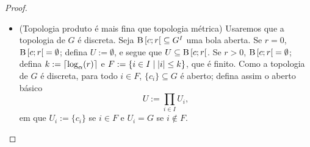 \begin{proof}
\begin{itemize}
	\item (Topologia produto é mais fina que topologia métrica) Usaremos que a topologia de $G$ é discreta. Seja $\mathrm{B}\left[{c};{r}\right[ \subseteq G^{I}$ uma bola aberta. Se $r=0$, $\mathrm{B}\left[{c};{r}\right[ = \emptyset$; defina $U := \emptyset$, e segue que $U \subseteq \mathrm{B}\left[{c};{r}\right[$. Se $r>0$, $\mathrm{B}\left[{c};{r}\right[ = \emptyset$; defina $k := \left\lceil{\log_{\alpha}(r)}\right\rceil$ e $F := \left\{{i \in I}\;\middle\vert\;{\left\vert{i}\right\vert \leq k}\right\}$, que é finito. Como a topologia de $G$ é discreta, para todo $i \in F$, $\{c_i\} \subseteq G$ é aberto; defina assim o aberto básico
		\begin{equation*}
		U := \prod_{i \in I} U_i,
		\end{equation*}
	em que $U_i := \{c_i\}$ se $i \in F$ e $U_i = G$ se $i \notin F$. %



\end{itemize}
\end{proof}
